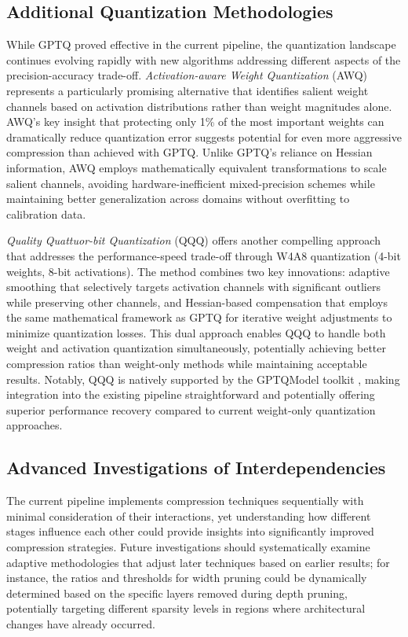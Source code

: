 \subsection{Additional Quantization Methodologies}

While GPTQ proved effective in the current pipeline, the quantization landscape continues evolving rapidly with new algorithms addressing different aspects of the precision-accuracy trade-off. \textit{Activation-aware Weight Quantization} (AWQ) \cite{awq} represents a particularly promising alternative that identifies salient weight channels based on activation distributions rather than weight magnitudes alone. AWQ's key insight that protecting only 1\% of the most important weights can dramatically reduce quantization error suggests potential for even more aggressive compression than achieved with GPTQ. Unlike GPTQ's reliance on Hessian information, AWQ employs mathematically equivalent transformations to scale salient channels, avoiding hardware-inefficient mixed-precision schemes while maintaining better generalization across domains without overfitting to calibration data.

\textit{Quality Quattuor-bit Quantization} (QQQ) \cite{qqq} offers another compelling approach that addresses the performance-speed trade-off through W4A8 quantization (4-bit weights, 8-bit activations). The method combines two key innovations: adaptive smoothing that selectively targets activation channels with significant outliers while preserving other channels, and Hessian-based compensation that employs the same mathematical framework as GPTQ for iterative weight adjustments to minimize quantization losses. This dual approach enables QQQ to handle both weight and activation quantization simultaneously, potentially achieving better compression ratios than weight-only methods while maintaining acceptable results. Notably, QQQ is natively supported by the GPTQModel toolkit \cite{gptqmodel}, making integration into the existing pipeline straightforward and potentially offering superior performance recovery compared to current weight-only quantization approaches.

\subsection{Advanced Investigations of Interdependencies} \label{advanced_interdep}

The current pipeline implements compression techniques sequentially with minimal consideration of their interactions, yet understanding how different stages influence each other could provide insights into significantly improved compression strategies. Future investigations should systematically examine adaptive methodologies that adjust later techniques based on earlier results; for instance, the ratios and thresholds for width pruning could be dynamically determined based on the specific layers removed during depth pruning, potentially targeting different sparsity levels in regions where architectural changes have already occurred.

